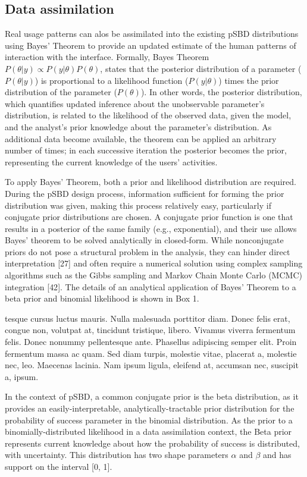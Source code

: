 \documentclass[]{article}
\newenvironment{WrapText}[1][r]
  {\wrapfigure{#1}{0.5\textwidth}\tcolorbox}
  {\endtcolorbox\endwrapfigure}
\newcommand\Text{%
tesque cursus luctus mauris. Nulla malesuada porttitor diam. Donec felis erat, congue non, volutpat at, tincidunt tristique, libero. Vivamus viverra fermentum felis. Donec nonummy pellentesque ante. Phasellus adipiscing semper elit. Proin fermentum massa ac quam. Sed diam turpis, molestie vitae, placerat a, molestie nec, leo. Maecenas lacinia. Nam ipsum ligula, eleifend at, accumsan nec, suscipit a, ipsum.}
\begin{document}
\subsection{Data assimilation}\label{data-assimilation}

Real usage patterns can alos be assimilated into the existing pSBD
distributions using Bayes' Theorem to provide an updated estimate of the
human patterns of interaction with the interface. Formally, Bayes
Theorem \(P(\theta \vert y) \propto P(y \vert \theta)P(\theta)\), states
that the posterior distribution of a parameter (\(P(\theta \vert y)\))
is proportional to a likelihood function (\(P(y \vert \theta)\)) times
the prior distribution of the parameter (\(P(\theta)\)). In other words,
the posterior distribution, which quantifies updated inference about the
unobservable parameter's distribution, is related to the likelihood of
the observed data, given the model, and the analyst's prior knowledge
about the parameter's distribution. As additional data become available,
the theorem can be applied an arbitrary number of times; in each
successive iteration the posterior becomes the prior, representing the
current knowledge of the users' activities.

To apply Bayes' Theorem, both a prior and likelihood distribution are
required. During the pSBD design process, information sufficient for
forming the prior distribution was given, making this process relatively
easy, particularly if conjugate prior distributions are chosen. A
conjugate prior function is one that results in a posterior of the same
family (e.g., exponential), and their use allows Bayes' theorem to be
solved analytically in closed-form. While nonconjugate priors do not
pose a structural problem in the analysis, they can hinder direct
interpretation {[}27{]} and often require a numerical solution using
complex sampling algorithms such as the Gibbs sampling and Markov Chain
Monte Carlo (MCMC) integration {[}42{]}. The details of an analytical
application of Bayes' Theorem to a beta prior and binomial likelihood is
shown in Box 1.

\begin{WrapText}
\Text
\end{WrapText}

In the context of pSBD, a common conjugate prior is the beta
distribution, as it provides an easily-interpretable,
analytically-tractable prior distribution for the probability of success
parameter in the binomial distribution. As the prior to a
binomially-distributed likelihood in a data assimilation context, the
Beta prior represents current knowledge about how the probability of
success is distributed, with uncertainty. This distribution has two
shape parameters \(\alpha\) and \(\beta\) and has support on the
interval {[}0, 1{]}.\strut
\end{document}
